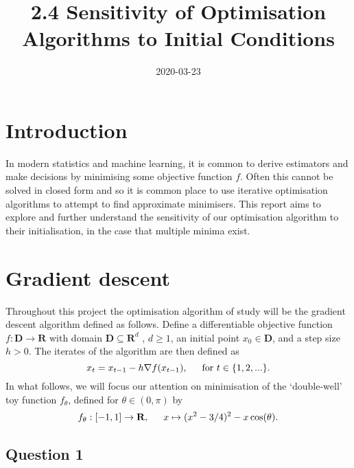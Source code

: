 \documentclass{article}
\title{2.4 Sensitivity of Optimisation Algorithms to Initial Conditions}
\date{2020-03-23}
\begin{document}
\maketitle

\section{Introduction}

In modern statistics and machine learning, it is common to derive estimators and make decisions by minimising some objective function $f$. Often this cannot be solved in closed form and so it is common place to use iterative optimisation algorithms to attempt to find approximate minimisers. This report aims to explore and further understand the sensitivity of our optimisation algorithm to their initialisation, in the case that multiple minima exist.

\newpage

\section{Gradient descent}

Throughout this project the optimisation algorithm of study will be the gradient descent algorithm defined as follows. Define a differentiable objective function $f : \textbf{D} \to \textbf{R} $ with domain $\textbf{D} \subseteq \textbf{R}^d$ , $d \geq 1$, an initial point $x_0 \in \textbf{D}$, and a step size $h > 0$. The iterates of the algorithm are then defined as 
\begin{equation}
x_t=x_{t-1}-h \nabla f(x_{t-1}), \indent  \text{for } t \in \{ 1,2,... \} .
\end{equation}
In what follows, we will focus our attention on minimisation of the ‘double-well’ toy function $f_\theta$, defined for $\theta \in (0, \pi)$ by
\begin{equation}
f_\theta : [-1,1] \to \textbf{R}, \indent x \mapsto (x^2 - 3/4)^2 - x \cos(\theta).
\end{equation}

\subsection{Question 1}
\end{document}

